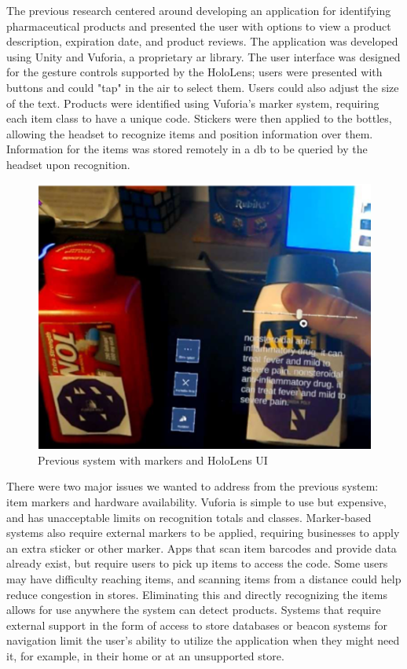 \documentclass[thesis]{fputhesis}
\begin{document}
\begin{body}
The previous research centered around developing an application for identifying pharmaceutical products and presented the user with options to view a product description, expiration date, and product reviews. The application was developed using Unity and Vuforia, a proprietary \acrshort{ar} library. The user interface was designed for the gesture controls supported by the HoloLens; users were presented with buttons and could "tap" in the air to select them. Users could also adjust the size of the text. Products were identified using Vuforia's marker system, requiring each item class to have a unique code. Stickers were then applied to the bottles, allowing the headset to recognize items and position information over them. Information for the items was stored remotely in a \acrfull{db} to be queried by the headset upon recognition. 

\begin{figure}[h]
    \centering
    \includegraphics[width=0.6\linewidth]{Images/hololens work.png}
    \caption{Previous system with markers and HoloLens UI}
    \label{fig:hololens-work}
\end{figure}

There were two major issues we wanted to address from the previous system: item markers and hardware availability. Vuforia is simple to use but expensive, and has unacceptable limits on recognition totals and classes. Marker-based systems also require external markers to be applied, requiring businesses to apply an extra sticker or other marker. Apps that scan item barcodes and provide data already exist, but require users to pick up items to access the code. Some users may have difficulty reaching items, and scanning items from a distance could help reduce congestion in stores. Eliminating this and directly recognizing the items allows for use anywhere the system can detect products. Systems that require external support in the form of access to store databases or beacon systems for navigation limit the user's ability to utilize the application when they might need it, for example, in their home or at an unsupported store.


\end{body}
\end{document}
